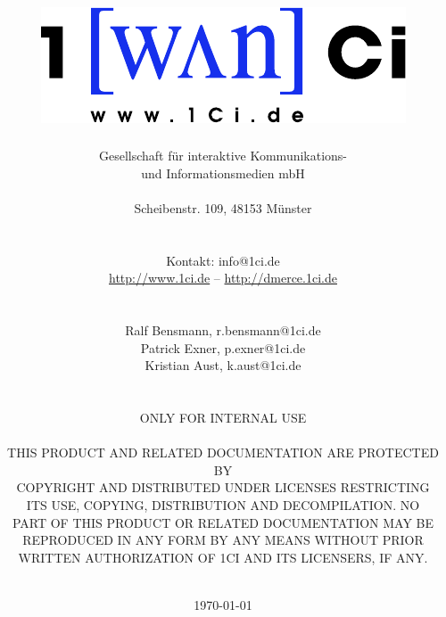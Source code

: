 \title{\includegraphics{1ci_logo.pdf}\\
\dmerce}
\author{Gesellschaft f\"ur interaktive Kommunikations-\\
und Informationsmedien mbH\\
\\
Scheibenstr. 109, 48153 M\"unster\\
\\
\\
Kontakt: info@1ci.de\\
\href{1Ci}{http://www.1ci.de} -- \href{dmerce}{http://dmerce.1ci.de}\\
\\
\\
Ralf Bensmann, r.bensmann@1ci.de\\
Patrick Exner, p.exner@1ci.de\\
Kristian Aust, k.aust@1ci.de\\
\\
\\
ONLY FOR INTERNAL USE\\
\\
THIS PRODUCT AND RELATED DOCUMENTATION ARE PROTECTED BY\\
COPYRIGHT AND DISTRIBUTED UNDER LICENSES RESTRICTING\\
ITS USE, COPYING, DISTRIBUTION AND DECOMPILATION\@. NO \\
PART OF THIS PRODUCT OR RELATED DOCUMENTATION MAY BE\\
REPRODUCED IN ANY FORM BY ANY MEANS WITHOUT PRIOR\\
WRITTEN AUTHORIZATION OF 1CI AND ITS LICENSERS, IF ANY.\\
\\
\date{\today}}
